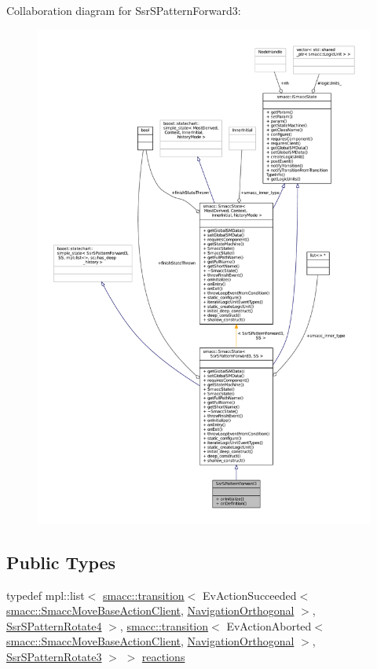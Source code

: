 Collaboration diagram for Ssr\+S\+Pattern\+Forward3\+:
\nopagebreak
\begin{figure}[H]
\begin{center}
\leavevmode
\includegraphics[width=350pt]{structSsrSPatternForward3__coll__graph}
\end{center}
\end{figure}
\subsection*{Public Types}
\begin{DoxyCompactItemize}
\item 
typedef mpl\+::list$<$ \hyperlink{classsmacc_1_1transition}{smacc\+::transition}$<$ Ev\+Action\+Succeeded$<$ \hyperlink{classsmacc_1_1SmaccMoveBaseActionClient}{smacc\+::\+Smacc\+Move\+Base\+Action\+Client}, \hyperlink{classNavigationOrthogonal}{Navigation\+Orthogonal} $>$, \hyperlink{structSsrSPatternRotate4}{Ssr\+S\+Pattern\+Rotate4} $>$, \hyperlink{classsmacc_1_1transition}{smacc\+::transition}$<$ Ev\+Action\+Aborted$<$ \hyperlink{classsmacc_1_1SmaccMoveBaseActionClient}{smacc\+::\+Smacc\+Move\+Base\+Action\+Client}, \hyperlink{classNavigationOrthogonal}{Navigation\+Orthogonal} $>$, \hyperlink{structSsrSPatternRotate3}{Ssr\+S\+Pattern\+Rotate3} $>$ $>$ \hyperlink{structSsrSPatternForward3_ae9f5e625bcb7c0b7f04ad2cf6b37b13f}{reactions}
\end{DoxyCompactItemize}
